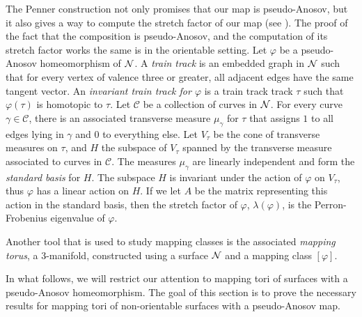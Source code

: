  The Penner construction not only promises that our map is pseudo-Anosov, but it also gives a way to
compute the stretch factor of our map (see \cite{penner1988construction}).  The proof of the fact
that the composition is pseudo-Anosov, and the computation of its stretch factor works the same is
in the orientable setting.  Let $\varphi$ be a pseudo-Anosov homeomorphism of $\mathcal{N}$.  A {\it train track} is an embedded graph in $\mathcal{N}$ such that for every vertex of valence three or greater, all adjacent edges have the same tangent vector.  An {\it invariant train track for $\varphi$} is a train track track $\tau$ such that $\varphi(\tau)$ is homotopic to $\tau$.  Let $\mathcal{C}$ be a collection of curves in $\mathcal{N}$. %
For every curve $\gamma \in\mathcal{C}$, there is an associated transverse measure
$\mu_\gamma$ for $\tau$ that assigns $1$ to all edges lying in $\gamma$ and 0 to everything else. Let $V_\tau$
be the cone of transverse measures on $\tau$, and $H$ the subspace of $V_\tau$ spanned by the
transverse measure associated to curves in $\mathcal{C}$.
The measures $\mu_\gamma$ are linearly independent and form the \textit{standard basis} for $H$. The subspace $H$ is invariant under the action of $\varphi$ on $V_\tau$, thus $\varphi$ has a linear action on $H$. If we let $A$
be the matrix representing this action in the standard basis, then the stretch factor of $\varphi$,
$\lambda(\varphi)$, is the Perron-Frobenius eigenvalue of $\varphi$.

Another tool that is used to study mapping classes is the associated \emph{mapping torus}, a $3$-manifold, constructed using a surface $\mathcal{N}$ and a mapping class $[\varphi]$.


In what follows, we will restrict our attention to mapping
tori of surfaces with a pseudo-Anosov homeomorphism.  %
The goal of this section is to prove the necessary results for mapping tori of non-orientable surfaces with a pseudo-Anosov map.%

